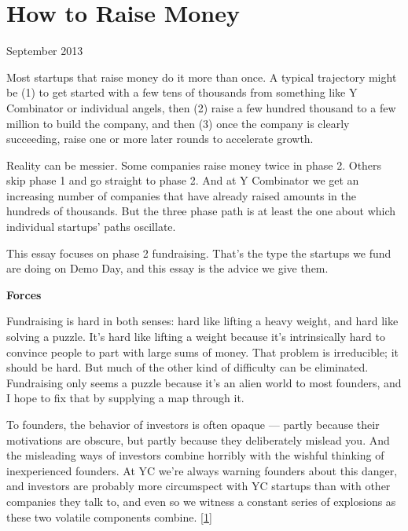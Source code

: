 \chapter{How to Raise Money}


            
              
                


                  
                    September 2013

Most startups that raise money do
                    it more than once. A typical trajectory might be (1) to get
                    started with a few tens of thousands from something like Y
                    Combinator or individual angels, then (2) raise a few
                    hundred thousand to a few million to build the company, and
                    then (3) once the company is clearly succeeding, raise one
                    or more later rounds to accelerate growth.

Reality
                    can be messier. Some companies raise money twice in phase 2.
                    Others skip phase 1 and go straight to phase 2. And at
                    Y Combinator we get an increasing number of companies
                    that have already raised amounts in the hundreds of
                    thousands. But the three phase path is at least the one
                    about which individual startups' paths oscillate.

This
                    essay focuses on phase 2 fundraising. That's the type the
                    startups we fund are doing on Demo Day, and this essay is
                    the advice we give them.


                    \textbf{Forces}

Fundraising is hard in both senses:
                    hard like lifting a heavy weight, and hard like solving a
                    puzzle. It's hard like lifting a weight because it's
                    intrinsically hard to convince people to part with large
                    sums of money. That problem is irreducible; it should be
                    hard. But much of the other kind of difficulty can be
                    eliminated. Fundraising only seems a puzzle because it's an
                    alien world to most founders, and I hope to fix that by
                    supplying a map through it.

To founders, the
                    behavior of investors is often opaque --- partly because
                    their motivations are obscure, but partly because they
                    deliberately mislead you. And the misleading ways of
                    investors combine horribly with the wishful thinking of
                    inexperienced founders. At YC we're always warning founders
                    about this danger, and investors are probably more
                    circumspect with YC startups than with other companies they
                    talk to, and even so we witness a constant series of
                    explosions as these two volatile components combine.
                    [\href{\#f1n}{1}]

